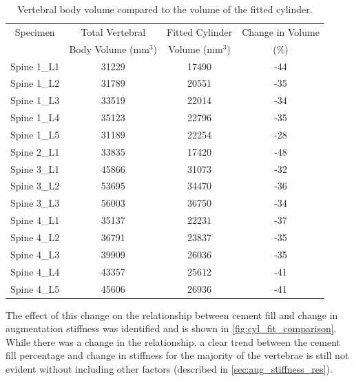 \begin{table}[ht!]
\centering
  \caption{Vertebral body volume compared to the volume of the fitted cylinder.}
	\label{tab:vertebrae_vol_cyl}
  \begin{tabular}{c |c|c|c}
	  Specimen & Total Vertebral  & Fitted Cylinder & Change in Volume\\ 
	  &Body Volume (mm$^3$)&Volume (mm$^3$) &(\%)\\ \hline \hline
	  Spine 1\_L1  & 31229 & 17490 & -44\\
	  Spine 1\_L2  & 31789 & 20551 & -35\\
	  Spine 1\_L3  & 33519 & 22014 & -34\\
	  Spine 1\_L4  & 35123 & 22796 & -35\\
	  Spine 1\_L5  & 31189 & 22254 & -28\\
	  Spine 2\_L1  & 33835 & 17420 & -48\\
	  Spine 3\_L1  & 45866 & 31073 & -32\\
	  Spine 3\_L2  & 53695 & 34470 & -36\\
	  Spine 3\_L3  & 56003 & 36750 & -34\\
	  Spine 4\_L1  & 35137 & 22231 & -37\\
	  Spine 4\_L2  & 36791 & 23837 & -35\\
	  Spine 4\_L3  & 39909 & 26036 & -35\\
	  Spine 4\_L4  & 43357 & 25612 & -41\\
	  Spine 4\_L5  & 45606 & 26936 & -41\\
	  \hline
  \end{tabular}

\end{table}

The effect of this change on the relationship between cement fill and change in augmentation stiffness was identified and is shown in \cref{fig:cyl_fit_comparison}.
While there was a change in the relationship, a clear trend between the cement fill percentage and change in stiffness for the majority of the vertebrae is still not evident without including other factors (described in \cref{sec:aug_stiffness_res}).

